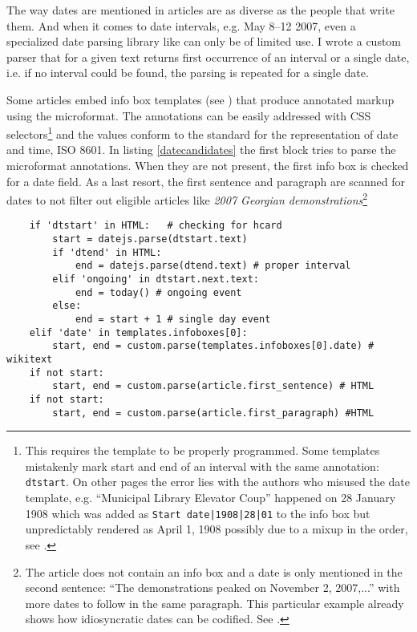 The way dates are mentioned in articles are as diverse as the people that write them.
And when it comes to date intervals, e.g. May 8--12 2007, even a specialized date parsing library like  can only be of limited use.
I wrote a custom parser that for a given text returns first occurrence of an interval or a single date, i.e. if no interval could be found, the parsing is repeated for a single date.

Some articles embed info box templates (see ) that produce annotated markup using the  microformat.
The annotations can be easily addressed with CSS selectors\footnote{This requires the template to be properly programmed. Some templates mistakenly mark start and end of an interval with the same annotation: \verb"dtstart". On other pages the error lies with the authors who misused the date template, e.g. ``Municipal Library Elevator Coup'' happened on 28 January 1908 which was added as  \verb"Start date|1908|28|01" to the info box but unpredictably rendered as April 1, 1908 possibly due to a mixup in the order, see .} and the values conform to the standard for the representation of date and time, ISO 8601.
In listing \ref{datecandidates} the first block tries to parse the microformat annotations.
When they are not present, the first info box is checked for a date field.
As a last resort, the first sentence and paragraph are scanned for dates to not filter out eligible articles like \emph{2007 Georgian demonstrations}\footnote{The article does not contain an info box and a date is only mentioned in the second sentence: ``The demonstrations peaked on November 2, 2007,...'' with more dates to follow in the same paragraph. This particular example already shows how idiosyncratic dates can be codified. See .}

\begin{lstlisting}
	if 'dtstart' in HTML:	# checking for hcard
		start = datejs.parse(dtstart.text)
		if 'dtend' in HTML:
			end = datejs.parse(dtend.text) # proper interval
		elif 'ongoing' in dtstart.next.text:
			end = today() # ongoing event
		else:
			end = start + 1 # single day event
	elif 'date' in templates.infoboxes[0]:
		start, end = custom.parse(templates.infoboxes[0].date) # wikitext
	if not start:
		start, end = custom.parse(article.first_sentence) # HTML
	if not start:
		start, end = custom.parse(article.first_paragraph) #HTML
\end{lstlisting}

